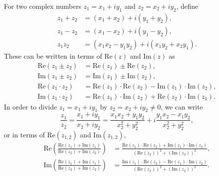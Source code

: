 \begin{tcolorbox}[title={Introduction to Complex Numbers}]
    \begin{definition}
        For two complex numbers $z_1=x_1+iy_1$ and $z_2=x_2+iy_2$, define
        \begin{align*}
            z_1 + z_2 &= (x_1+x_2)+i(y_1+y_2),\\
            z_1 - z_2 &= (x_1-x_2)+i(y_1-y_2),\\
            z_1z_2 &= (x_1x_2-y_1y_2) + i(x_1y_2+x_2y_1).
        \end{align*}
        These can be written in terms of $\text{Re}(z)$ and $\text{Im}(z)$ as
        \begin{align*}
            \text{Re}(z_1 \pm z_2) &= \text{Re}(z_1)\pm\text{Re}(z_2),\\
            \text{Im}(z_1 \pm z_2) &= \text{Im}(z_1)\pm\text{Im}(z_2),\\
            \text{Re}(z_1 \cdot z_2) &= \text{Re}(z_1)\cdot\text{Re}(z_2)-\text{Im}(z_1)\cdot\text{Im}(z_2),\\
            \text{Im}(z_1 \cdot z_2) &= \text{Re}(z_1)\cdot\text{Im}(z_2)+\text{Re}(z_2)\cdot\text{Im}(z_1).
        \end{align*}
        In order to divide $z_1=x_1+iy_1$ by $z_2=x_2+iy_2\neq 0$, we can write
        \[\frac{z_1}{z_2}=\frac{x_1+iy_1}{x_2+iy_2} = \frac{x_1x_2+y_1y_2}{x_2^2+y_2^2} + i\frac{y_1x_2-x_1y_2}{x_2^2+y_2^2},\]
        or in terms of $\text{Re}(z_{1,2})$ and $\text{Im}(z_{1,2})$,
        \begin{align*}
            \text{Re}\left(\frac{\text{Re}(z_1)+\text{Im}(z_1)}{\text{Re}(z_2)+\text{Im}(z_2)}\right) &= \frac{\text{Re}(z_1)\cdot\text{Re}(z_2)+\text{Im}(z_1)\cdot\text{Im}(z_2)}{\left(\text{Re}(z_2)\right)^2+\left(\text{Im}(z_2)\right)^2},\\
            \text{Im}\left(\frac{\text{Re}(z_1)+\text{Im}(z_1)}{\text{Re}(z_2)+\text{Im}(z_2)}\right) &= \frac{\text{Im}(z_1)\cdot\text{Re}(z_2)-\text{Re}(z_1)\cdot\text{Im}(z_2)}{\left(\text{Re}(z_2)\right)^2+\left(\text{Im}(z_2)\right)^2}.
        \end{align*}
    \end{definition}
\end{tcolorbox}

